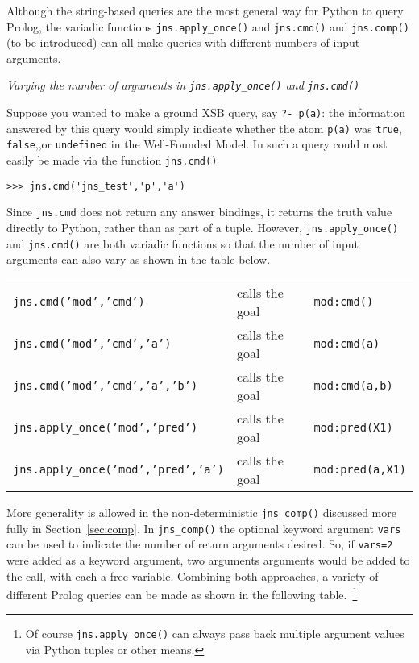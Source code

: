 Although the string-based queries are the most general way for Python
to query Prolog, the variadic functions {\tt jns.apply\_once()} and
{\tt jns.cmd()} and {\tt jns.comp()} (to be introduced) can all make
queries with different numbers of input arguments.

\begin{example} \rm {\it Varying the number of arguments in {\tt jns.apply\_once()} and {\tt jns.cmd()} } \label{ex:variadic-examples}

Suppose you wanted to make a ground XSB query, say {\tt ?- p(a)}: the
information answered by this query would simply indicate whether the
atom {\tt p(a)} was {\tt true}, {\tt false},,or {\tt undefined} in the
Well-Founded Model. In \januspy{} such a query could most easily be
made via the \januspy{} function {\tt jns.cmd()}

\begin{verbatim}  
>>> jns.cmd('jns_test','p','a')  
\end{verbatim}  

Since {\tt jns.cmd} does not return any answer bindings, it
returns the truth value directly to Python, rather than as part of a
tuple.  However, {\tt jns.apply\_once()} and {\tt jns.cmd()} are both
variadic functions so that the number of input arguments can also vary
as shown in the table below.

\begin{tabular}{lll}
  {\tt jns.cmd('mod','cmd')}                & calls the goal & {\tt mod:cmd()}\\
  {\tt jns.cmd('mod','cmd','a')}            & calls the goal & {\tt mod:cmd(a)}\\
  {\tt jns.cmd('mod','cmd','a','b')}        & calls the goal & {\tt mod:cmd(a,b)}\\
  {\tt jns.apply\_once('mod','pred')}              & calls the goal & {\tt mod:pred(X1)} \\
  {\tt jns.apply\_once('mod','pred','a')}          & calls the goal & {\tt mod:pred(a,X1)} \\
\end{tabular}

More generality is allowed in the non-deterministic {\tt jns\_comp()}
discussed more fully in Section~\ref{sec:comp}.  In {\tt jns\_comp()}
the optional keyword argument {\tt vars} can be used to indicate the
number of return arguments desired.  So, if {\tt vars=2} were added as
a keyword argument, two arguments arguments would be added to the
call, with each a free variable.  Combining both approaches, a variety
of different Prolog queries can be made as shown in the following
table.~\footnote{
Of course {\tt jns.apply\_once()} can always pass back multiple
argument values via Python tuples or other means.}


\end{example}

